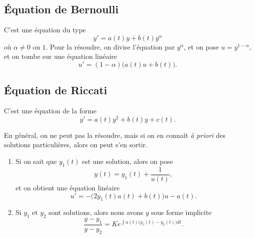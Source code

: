 \subsection{Équation de Bernoulli}
\label{SubSecBernh}

C'est une équation du type
\begin{equation}	\label{EqBerNDiffalp}
	y'=a(t)y+b(t)y^{\alpha}
\end{equation}
où \( \alpha\neq 0\) ou \( 1\). Pour la résoudre, on divise l'équation par \( y^{\alpha}\), et on pose \( u=y^{1-\alpha}\), et on tombe sur une équation linéaire
\begin{equation}
	u'=(1-\alpha)\big( a(t)u+b(t) \big).
\end{equation}

\subsection{Équation de Riccati}
\label{SubSecRicatti}

\begin{definition}
	C'est une équation de la forme
	\begin{equation}		\label{EqDiffGFeneRicatti}
		y'=a(t)y^2+b(t)y+c(t).
	\end{equation}
\end{definition}

En général, on ne peut pas la résoudre, mais si on en connaît \emph{à priori} des solutions particulières, alors on peut s'en sortir.

\begin{enumerate}

	\item
	      Si on sait que \( y_1(t)\) est une solution, alors on pose
	      \begin{equation}
		      y(t)=y_1(t)+\frac{1}{ u(t) },
	      \end{equation}
	      et on obtient une équation linéaire
	      \begin{equation}
		      u'=-\big( 2y_1(t)a(t)+b(t) \big)u-a(t).
	      \end{equation}

	\item
	      Si \( y_1\) et \( y_2\) sont solutions, alors nous avons \( y\) sous forme implicite
	      \begin{equation}
		      \frac{ y-y_1 }{ y-y_2 }=K e^{\int a(t)\big( y_1(t)-y_2(t) \big)dt}.
	      \end{equation}
\end{enumerate}


